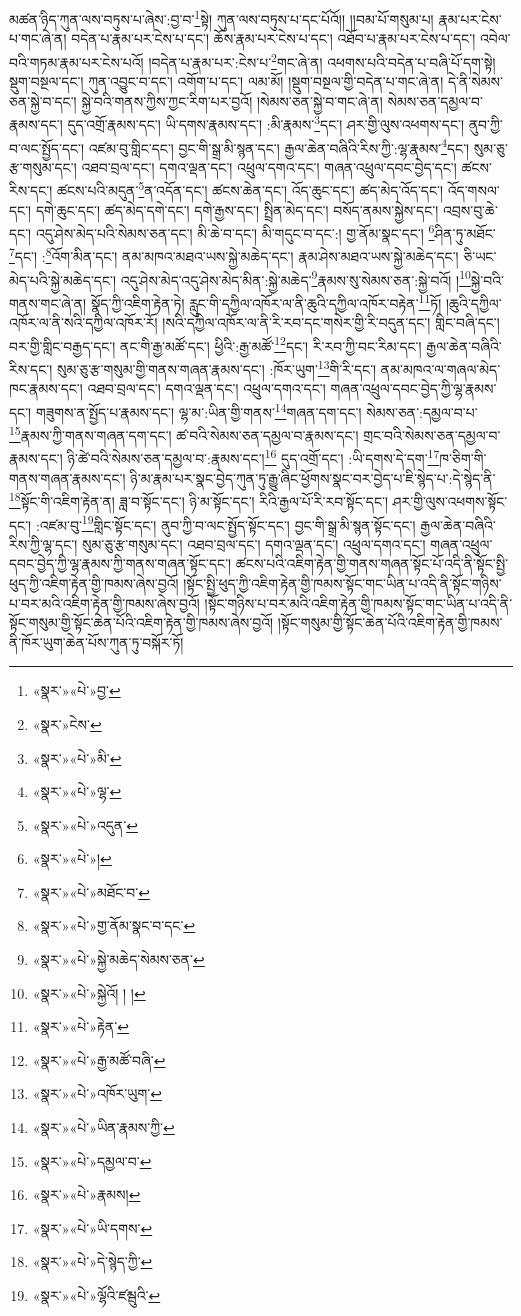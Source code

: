 མཚན་ཉིད་ཀུན་ལས་བཏུས་པ་ཞེས་:བྱ་བ་\footnote{«སྣར་»«པེ་»བྱ་}སྟེ། ཀུན་ལས་བཏུས་པ་དང་པོའོ།། །།བམ་པོ་གསུམ་པ། རྣམ་པར་ངེས་པ་གང་ཞེ་ན། བདེན་པ་རྣམ་པར་ངེས་པ་དང་། ཆོས་རྣམ་པར་ངེས་པ་དང་། འཐོབ་པ་རྣམ་པར་ངེས་པ་དང་། འབེལ་བའི་གཏམ་རྣམ་པར་ངེས་པའོ། །བདེན་པ་རྣམ་པར་:ངེས་པ་\footnote{«སྣར་»ངེས་}གང་ཞེ་ན། འཕགས་པའི་བདེན་པ་བཞི་པོ་དག་སྟེ། སྡུག་བསྔལ་དང་། ཀུན་འབྱུང་བ་དང་། འགོག་པ་དང་། ལམ་མོ། །སྡུག་བསྔལ་གྱི་བདེན་པ་གང་ཞེ་ན། དེ་ནི་སེམས་ཅན་སྐྱེ་བ་དང་། སྐྱེ་བའི་གནས་ཀྱིས་ཀྱང་རིག་པར་བྱའོ། །སེམས་ཅན་སྐྱེ་བ་གང་ཞེ་ན། སེམས་ཅན་དམྱལ་བ་རྣམས་དང་། དུད་འགྲོ་རྣམས་དང་། ཡི་དགས་རྣམས་དང་། :མི་རྣམས་\footnote{«སྣར་»«པེ་»མི་}དང་། ཤར་གྱི་ལུས་འཕགས་དང་། ནུབ་ཀྱི་བ་ལང་སྤྱོད་དང་། འཛམ་བུ་གླིང་དང་། བྱང་གི་སྒྲ་མི་སྙན་དང་། རྒྱལ་ཆེན་བཞིའི་རིས་ཀྱི་:ལྷ་རྣམས་\footnote{«སྣར་»«པེ་»ལྷ་}དང་། སུམ་ཅུ་རྩ་གསུམ་དང་། འཐབ་བྲལ་དང་། དགའ་ལྡན་དང་། འཕྲུལ་དགའ་དང་། གཞན་འཕྲུལ་དབང་བྱེད་དང་། ཚངས་རིས་དང་། ཚངས་པའི་མདུན་\footnote{«སྣར་»«པེ་»འདུན་}ན་འདོན་དང་། ཚངས་ཆེན་དང་། འོད་ཆུང་དང་། ཚད་མེད་འོད་དང་། འོད་གསལ་དང་། དགེ་ཆུང་དང་། ཚད་མེད་དགེ་དང་། དགེ་རྒྱས་དང་། སྤྲིན་མེད་དང་། བསོད་ནམས་སྐྱེས་དང་། འབྲས་བུ་ཆེ་དང་། འདུ་ཤེས་མེད་པའི་སེམས་ཅན་དང་། མི་ཆེ་བ་དང་། མི་གདུང་བ་དང་:། གྱ་ནོམ་སྣང་དང་། \footnote{«སྣར་»«པེ་»།  }ཤིན་ཏུ་མཐོང་\footnote{«སྣར་»«པེ་»མཐོང་བ་}དང་། :\footnote{«སྣར་»«པེ་»གྱ་ནོམ་སྣང་བ་དང་}འོག་མིན་དང་། ནམ་མཁའ་མཐའ་ཡས་སྐྱེ་མཆེད་དང་། རྣམ་ཤེས་མཐའ་ཡས་སྐྱེ་མཆེད་དང་། ཅི་ཡང་མེད་པའི་སྐྱེ་མཆེད་དང་། འདུ་ཤེས་མེད་འདུ་ཤེས་མེད་མིན་:སྐྱེ་མཆེད་\footnote{«སྣར་»«པེ་»སྐྱེ་མཆེད་སེམས་ཅན་}རྣམས་སུ་སེམས་ཅན་:སྐྱེ་བའོ། །\footnote{«སྣར་»«པེ་»སྐྱེའོ། ། །}སྐྱེ་བའི་གནས་གང་ཞེ་ན། སྣོད་ཀྱི་འཇིག་རྟེན་ཏེ། རླུང་གི་དཀྱིལ་འཁོར་ལ་ནི་ཆུའི་དཀྱིལ་འཁོར་བརྟེན་\footnote{«སྣར་»«པེ་»རྟེན་}ཏོ། །ཆུའི་དཀྱིལ་འཁོར་ལ་ནི་སའི་དཀྱིལ་འཁོར་རོ། །སའི་དཀྱིལ་འཁོར་ལ་ནི་རི་རབ་དང་གསེར་གྱི་རི་བདུན་དང་། གླིང་བཞི་དང་། བར་གྱི་གླིང་བརྒྱད་དང་། ནང་གི་རྒྱ་མཚོ་དང་། ཕྱིའི་:རྒྱ་མཚོ་\footnote{«སྣར་»«པེ་»རྒྱ་མཚོ་བཞི་}དང་། རི་རབ་ཀྱི་བང་རིམ་དང་། རྒྱལ་ཆེན་བཞིའི་རིས་དང་། སུམ་ཅུ་རྩ་གསུམ་གྱི་གནས་གཞན་རྣམས་དང་། :ཁོར་ཡུག་\footnote{«སྣར་»«པེ་»འཁོར་ཡུག་}གི་རི་དང་། ནམ་མཁའ་ལ་གཞལ་མེད་ཁང་རྣམས་དང་། འཐབ་བྲལ་དང་། དགའ་ལྡན་དང་། འཕྲུལ་དགའ་དང་། གཞན་འཕྲུལ་དབང་བྱེད་ཀྱི་ལྷ་རྣམས་དང་། གཟུགས་ན་སྤྱོད་པ་རྣམས་དང་། ལྷ་མ་:ཡིན་གྱི་གནས་\footnote{«སྣར་»«པེ་»ཡིན་རྣམས་ཀྱི་}གཞན་དག་དང་། སེམས་ཅན་:དམྱལ་བ་པ་\footnote{«སྣར་»«པེ་»དམྱལ་བ་}རྣམས་ཀྱི་གནས་གཞན་དག་དང་། ཚ་བའི་སེམས་ཅན་དམྱལ་བ་རྣམས་དང་། གྲང་བའི་སེམས་ཅན་དམྱལ་བ་རྣམས་དང་། ཉི་ཚེ་བའི་སེམས་ཅན་དམྱལ་བ་:རྣམས་དང་།\footnote{«སྣར་»«པེ་»རྣམས།} དུད་འགྲོ་དང་། :ཡི་དགས་དེ་དག་\footnote{«སྣར་»«པེ་»ཡི་དགས་}ཁ་ཅིག་གི་གནས་གཞན་རྣམས་དང་། ཉི་མ་རྣམ་པར་སྣང་བྱེད་ཀུན་ཏུ་རྒྱུ་ཞིང་ཕྱོགས་སྣང་བར་བྱེད་པ་ཇི་སྙེད་པ་:དེ་སྙེད་ནི་\footnote{«སྣར་»«པེ་»དེ་སྙེད་ཀྱི་}སྟོང་གི་འཇིག་རྟེན་ན། ཟླ་བ་སྟོང་དང་། ཉི་མ་སྟོང་དང་། རིའི་རྒྱལ་པོ་རི་རབ་སྟོང་དང་། ཤར་གྱི་ལུས་འཕགས་སྟོང་དང་། :འཛམ་བུ་\footnote{«སྣར་»«པེ་»ལྷོའི་ཛམྦུའི་}གླིང་སྟོང་དང་། ནུབ་ཀྱི་བ་ལང་སྤྱོད་སྟོང་དང་། བྱང་གི་སྒྲ་མི་སྙན་སྟོང་དང་། རྒྱལ་ཆེན་བཞིའི་རིས་ཀྱི་ལྷ་དང་། སུམ་ཅུ་རྩ་གསུམ་དང་། འཐབ་བྲལ་དང་། དགའ་ལྡན་དང་། འཕྲུལ་དགའ་དང་། གཞན་འཕྲུལ་དབང་བྱེད་ཀྱི་ལྷ་རྣམས་ཀྱི་གནས་གཞན་སྟོང་དང་། ཚངས་པའི་འཇིག་རྟེན་གྱི་གནས་གཞན་སྟོང་པོ་འདི་ནི་སྟོང་སྤྱི་ཕུད་ཀྱི་འཇིག་རྟེན་གྱི་ཁམས་ཞེས་བྱའོ། །སྟོང་སྤྱི་ཕུད་ཀྱི་འཇིག་རྟེན་གྱི་ཁམས་སྟོང་གང་ཡིན་པ་འདི་ནི་སྟོང་གཉིས་པ་བར་མའི་འཇིག་རྟེན་གྱི་ཁམས་ཞེས་བྱའོ། །སྟོང་གཉིས་པ་བར་མའི་འཇིག་རྟེན་གྱི་ཁམས་སྟོང་གང་ཡིན་པ་འདི་ནི་སྟོང་གསུམ་གྱི་སྟོང་ཆེན་པོའི་འཇིག་རྟེན་གྱི་ཁམས་ཞེས་བྱའོ། །སྟོང་གསུམ་གྱི་སྟོང་ཆེན་པོའི་འཇིག་རྟེན་གྱི་ཁམས་ནི་ཁོར་ཡུག་ཆེན་པོས་ཀུན་ཏུ་བསྐོར་ཏོ། 